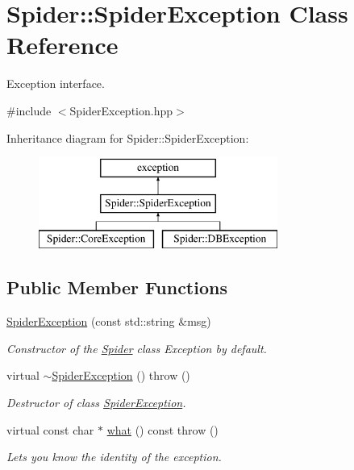 \hypertarget{class_spider_1_1_spider_exception}{}\section{Spider\+:\+:Spider\+Exception Class Reference}
\label{class_spider_1_1_spider_exception}


Exception interface.  




{\ttfamily \#include $<$Spider\+Exception.\+hpp$>$}

Inheritance diagram for Spider\+:\+:Spider\+Exception\+:\begin{figure}[H]
\begin{center}
\leavevmode
\includegraphics[height=3.000000cm]{class_spider_1_1_spider_exception}
\end{center}
\end{figure}
\subsection*{Public Member Functions}
\begin{DoxyCompactItemize}
\item 
\hyperlink{class_spider_1_1_spider_exception_a00b8eddad95f7872a6d30b5ab11cf3cc}{Spider\+Exception} (const std\+::string \&msg)
\begin{DoxyCompactList}\small\item\em Constructor of the \hyperlink{namespace_spider}{Spider} class Exception by default. \end{DoxyCompactList}\item 
\mbox{\label{class_spider_1_1_spider_exception_a173ce8fa7b60115be35381cb103e2f4f}} 
virtual \hyperlink{class_spider_1_1_spider_exception_a173ce8fa7b60115be35381cb103e2f4f}{$\sim$\+Spider\+Exception} ()  throw ()
\begin{DoxyCompactList}\small\item\em Destructor of class \hyperlink{class_spider_1_1_spider_exception}{Spider\+Exception}. \end{DoxyCompactList}\item 
virtual const char $\ast$ \hyperlink{class_spider_1_1_spider_exception_aa36edba94a51dc5fb53d54cc98931b2e}{what} () const  throw ()
\begin{DoxyCompactList}\small\item\em Lets you know the identity of the exception. \end{DoxyCompactList}\end{DoxyCompactItemize}


